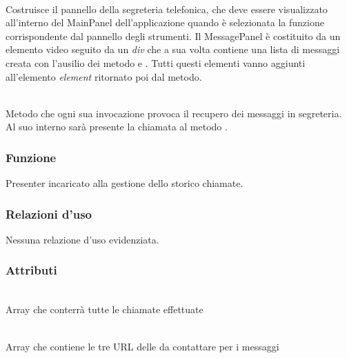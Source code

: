 \begin{description}
\item{}\\
Costruisce il pannello della segreteria telefonica, che deve essere visualizzato all'interno del MainPanel dell'applicazione quando è selezionata la funzione corrispondente dal pannello degli strumenti. Il MessagePanel è costituito da un elemento video seguito da un \textit{div} che a sua volta contiene una lista di messaggi creata con l'ausilio dei metodo  e . Tutti questi elementi vanno aggiunti all'elemento \textit{element} ritornato poi dal metodo.

\item{}\\
Metodo che ogni sua invocazione provoca il recupero dei messaggi in segreteria. Al suo interno sarà presente la chiamata al metodo .

\end{description}



\subsubsection*{Funzione}
Presenter incaricato alla gestione dello storico chiamate.

\subsubsection*{Relazioni d'uso}
Nessuna relazione d'uso evidenziata.

\subsubsection*{Attributi}
\begin{description}
\item{}\\
Array che conterrà tutte le chiamate effettuate
\item{}\\
Array che contiene le tre URL delle  da contattare per i messaggi
\end{description}

